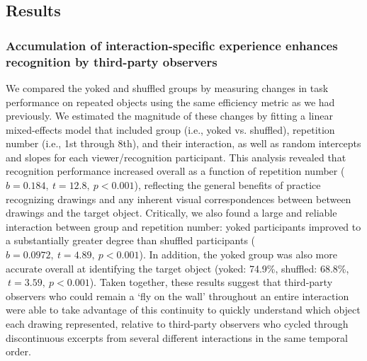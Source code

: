 \documentclass[10pt,letterpaper]{article}
\begin{document}
\subsection{Results}

\subsubsection{Accumulation of interaction-specific experience enhances recognition by third-party observers}



We compared the yoked and shuffled groups by measuring changes in task performance on repeated objects using the same efficiency metric as we had previously.
We estimated the magnitude of these changes by fitting a linear mixed-effects model that included group (i.e., yoked vs. shuffled), repetition number (i.e., 1st through 8th), and their interaction, as well as random intercepts and slopes for each viewer/recognition participant.
This analysis revealed that recognition performance increased overall as a function of repetition number ($b = 0.184, ~t = 12.8, ~p < 0.001$), reflecting the general benefits of practice recognizing drawings and any inherent visual correspondences between between drawings and the target object.  %
Critically, we also found a large and reliable interaction between group and repetition number: yoked participants improved to a substantially greater degree than shuffled participants ($b = 0.0972, ~t = 4.89, ~p<0.001$).
In addition, the yoked group was also more accurate overall at identifying the target object (yoked: 74.9\%, shuffled: 68.8\%, $~t = 3.59, ~p < 0.001$). %
Taken together, these results suggest that third-party observers who could remain a `fly on the wall' throughout an entire interaction were able to take advantage of this continuity to quickly understand which object each drawing represented, relative to third-party observers who cycled through discontinuous excerpts from several different interactions in the same temporal order.
\end{document}
